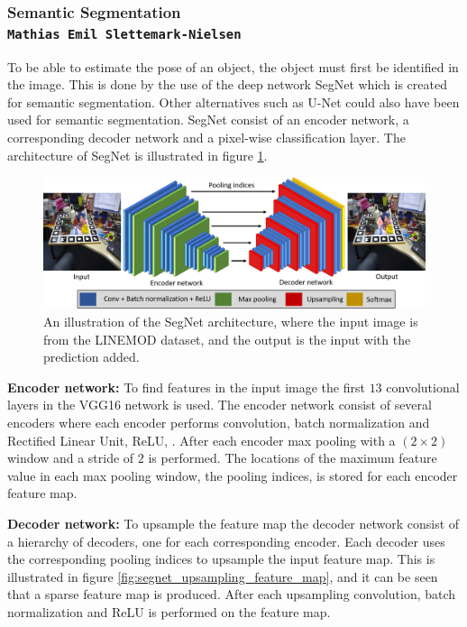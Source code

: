 \documentclass[../main.tex]{subfiles}
\begin{document}
\subsubsection{Semantic Segmentation\\ \normalfont\normalsize\texttt{Mathias Emil Slettemark-Nielsen}} \label{subsubsec:segnet}
To be able to estimate the pose of an object, the object must first be identified in the image. This is done by the use of the deep network SegNet \cite{segnet} which is created for semantic segmentation. Other alternatives such as U-Net \cite{unet} could also have been used for semantic segmentation. SegNet consist of an encoder network, a corresponding decoder network and a pixel-wise classification layer. The architecture of SegNet is illustrated in figure \ref{fig:segnet_architecture}.

\begin{figure}[H]
    \centering
    \includegraphics[width=\textwidth]{figures/segmentation/segnet_architecture.png}
    \caption{An illustration of the SegNet architecture, where the input image is from the LINEMOD dataset, and the output is the input with the prediction added.}
    \label{fig:segnet_architecture}
\end{figure}

\textbf{Encoder network:} To find features in the input image the first $13$ convolutional layers in the VGG16 network \cite{vgg} is used. The encoder network consist of several encoders where each encoder performs convolution, batch normalization \cite{batch_norm} and Rectified Linear Unit, ReLU, \cite{relu}. After each encoder max pooling with a $(2 \times 2)$ window and a stride of $2$ is performed. The locations of the maximum feature value in each max pooling window, the pooling indices, is stored for each encoder feature map.

\textbf{Decoder network:} To upsample the feature map the decoder network consist of a hierarchy of decoders, one for each corresponding encoder. Each decoder uses the corresponding pooling indices to upsample the input feature map. This is illustrated in figure \ref{fig:segnet_upsampling_feature_map}, and it can be seen that a sparse feature map is produced. After each upsampling convolution, batch normalization and ReLU is performed on the feature map.
\end{document}
